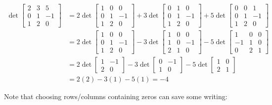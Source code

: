 \begin{applicationActivities}{2}{26}
\begin{observation}
  \begin{align*}
    \det \begin{bmatrix} 2 & 3 & 5  \\ 0 & 1 & -1  \\ 1 & 2 & 0  \end{bmatrix}
  &=
    2\det \begin{bmatrix} 1 & 0 & 0 \\ 0 & 1 & -1 \\ 1 & 2 & 0 \end{bmatrix}
    +3\det \begin{bmatrix} 0 & 1 & 0 \\ 0 & 1 & -1 \\ 1 & 2 & 0 \end{bmatrix}
    +5\det \begin{bmatrix} 0 & 0 & 1 \\ 0 & 1 & -1 \\ 1 & 2 & 0 \end{bmatrix}
  \\ &=
    2\det \begin{bmatrix} 1 & 0 & 0 \\ 0 & 1 & -1 \\ 1 & 2 & 0 \end{bmatrix}
    -3\det \begin{bmatrix} 1 & 0 & 0 \\ 1 & 0 & -1 \\ 2 & 1 & 0 \end{bmatrix}
    -5\det \begin{bmatrix} 1 & 0 & 0 \\ -1 & 1 & 0 \\ 0 & 2 & 1 \end{bmatrix}
  \\ &=
    2\det \begin{bmatrix}  1 & -1 \\  2 & 0 \end{bmatrix}
    -3\det \begin{bmatrix}  0 & -1 \\ 1 & 0 \end{bmatrix}
    -5\det \begin{bmatrix}  1 & 0 \\ 2 & 1 \end{bmatrix}
  \\ &=
    2(2)-3(1)-5(1) = -4
  \end{align*}
  \end{observation}

  \begin{observation}
  Note that choosing rows/columns containing zeros can save some writing:


\end{observation}
\end{applicationActivities}
